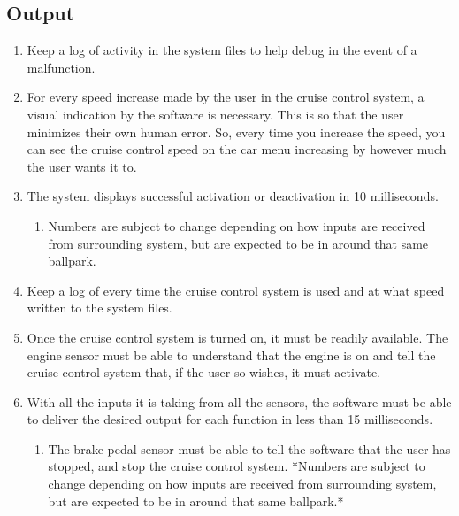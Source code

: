 \documentclass[preprint,11pt,3p]{article}
\begin{document}
\subsection{Output}
\begin{enumerate}
	\item Keep a log of activity in the system files to help debug in the event of a malfunction.
	\item For every speed increase made by the user in the cruise control system, a visual indication by the software is necessary. This is so that the user minimizes their own human error. So, every time you increase the speed, you can see the cruise control speed on the car menu increasing by however much the user wants it to.
	\item The system displays successful activation or deactivation in 10 milliseconds. 
		\begin{enumerate}
			\item Numbers are subject to change depending on how inputs are received from surrounding system, but are expected to be in around that same ballpark.
		\end{enumerate}
	\item Keep a log of every time the cruise control system is used and at what speed written to the system files.
	\item Once the cruise control system is turned on, it must be readily available. The engine sensor must be able to understand that the engine is on and tell the cruise control system that, if the user so wishes, it must activate. 
	\item With all the inputs it is taking from all the sensors, the software must be able to deliver the desired output for each function in less than 15 milliseconds. 
		\begin{enumerate}
			\item The brake pedal sensor must be able to tell the software that the user has stopped, and stop the cruise control system. *Numbers are subject to change depending on how inputs are received from surrounding system, but are expected to be in around that same ballpark.*
		\end{enumerate}
\end{enumerate}
\end{document}
